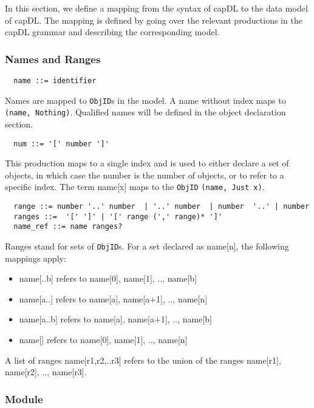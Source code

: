 \documentclass[a4paper,12pt]{article}
\begin{document}
In this section, we define a mapping from the syntax of capDL to the data model of capDL. The mapping is defined by going over the relevant productions in the capDL grammar and describing the corresponding model.

\subsubsection{Names and Ranges}

\begin{verbatim}
  name ::= identifier
\end{verbatim}

Names are mapped to \texttt{ObjID}s in the model. A name without index maps to \texttt{(name, Nothing)}. Qualified names will be defined in the object declaration section.

\begin{verbatim}
  num ::= '[' number ']'
\end{verbatim}
This production maps to a single index and is used to either declare a set of objects, in which case the number is the number of objects, or to refer to a specific index. The term name[x] maps to the \texttt{ObjID} \texttt{(name, Just x)}.

\begin{verbatim}
  range ::= number '..' number  | '..' number  | number  '..' | number            
  ranges ::=  '[' ']' | '[' range (',' range)* ']' 
  name_ref ::= name ranges?
\end{verbatim}

Ranges stand for sets of \texttt{ObjID}s. For a set declared as name[n], the following mappings apply:

\begin{itemize}
  \item name[..b] refers to name[0], name[1], .., name[b] 
  \item name[a..] refers to name[a], name[a+1], .., name[n]
  \item name[a..b] refers to name[a], name[a+1], .., name[b]
  \item name[] refers to name[0], name[1], .., name[n] 
\end{itemize}

A list of ranges name[r1,r2,..r3] refers to the union of the ranges name[r1], name[r2], .., name[r3].

\subsubsection{Module}
\end{document}
